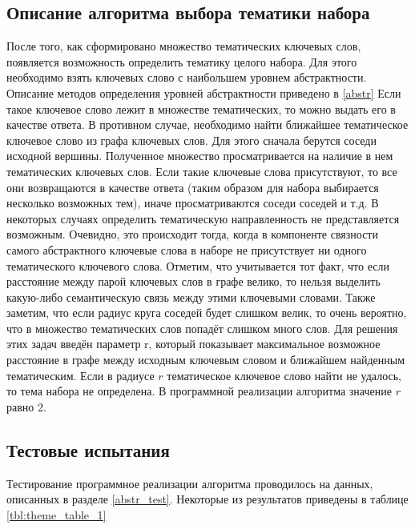 \subsection{Описание алгоритма выбора тематики набора}
После того, как сформировано множество тематических ключевых слов, появляется возможность определить тематику целого набора. Для этого необходимо взять ключевых слово с наибольшем уровнем абстрактности. Описание методов определения уровней абстрактности приведено в \ref{abstr} Если такое ключевое слово лежит в множестве тематических, то можно выдать его в качестве ответа. В противном случае, необходимо найти ближайшее тематическое ключевое слово из графа ключевых слов. Для этого сначала берутся соседи исходной вершины. Полученное множество просматривается на наличие в нем тематических ключевых слов. Если такие ключевые слова присутствуют, то все они возвращаются в качестве ответа (таким образом для набора выбирается несколько возможных тем), иначе просматриваются соседи соседей и т.д. В некоторых случаях определить тематическую направленность не представляется возможным. Очевидно, это происходит тогда, когда в компоненте связности самого абстрактного ключевые слова в наборе не присутствует ни одного тематического ключевого слова.  Отметим, что учитывается тот факт, что если расстояние между парой ключевых слов в графе велико, то нельзя выделить какую-либо семантическую связь между этими ключевыми словами. Также заметим, что если радиус круга соседей будет слишком велик, то очень вероятно, что в множество тематических слов попадёт слишком много слов. Для решения этих задач введён параметр r, который показывает максимальное возможное расстояние в графе между исходным ключевым словом и ближайшем найденным тематическим. Если в радиусе $r$ тематическое ключевое слово найти не удалось, то тема набора не определена. В программной реализации алгоритма значение $r$ равно 2.

\subsection{Тестовые испытания}
Тестирование программное реализации алгоритма проводилось на данных, описанных в разделе \ref{abstr_test}. Некоторые из результатов приведены в таблице \ref{tbl:theme_table_1}

